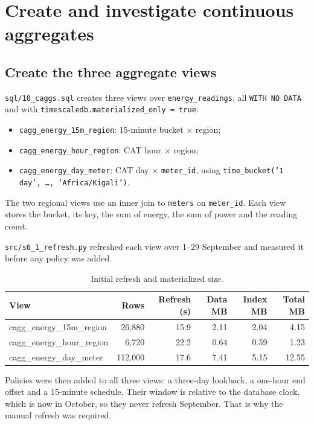 \documentclass[11pt,a4paper]{article}
\begin{document}
\section{Create and investigate continuous aggregates}

\subsection{Create the three aggregate views}
\texttt{sql/10\_caggs.sql} creates three views over \texttt{energy\_readings}, all
\texttt{WITH NO DATA} and with \texttt{timescaledb.materialized\_only = true}:
\begin{itemize}
\item \texttt{cagg\_energy\_15m\_region}: 15-minute bucket $\times$ region;
\item \texttt{cagg\_energy\_hour\_region}: CAT hour $\times$ region;
\item \texttt{cagg\_energy\_day\_meter}: CAT day $\times$ \texttt{meter\_id}, using
\texttt{time\_bucket('1 day', \ldots, 'Africa/Kigali')}.
\end{itemize}
The two regional views use an inner join to \texttt{meters} on \texttt{meter\_id}.
Each view stores the bucket, its key, the sum of energy, the sum of power and the
reading count.

\texttt{src/s6\_1\_refresh.py} refreshed each view over 1--29 September and measured it
before any policy was added.

\begin{table}[H]\centering\small
\begin{tabular}{lrrrrr}\toprule
View & Rows & Refresh (s) & Data MB & Index MB & Total MB\\\midrule
cagg\_energy\_15m\_region & 26,880 & 15.9 & 2.11 & 2.04 & 4.15\\
cagg\_energy\_hour\_region & 6,720 & 22.2 & 0.64 & 0.59 & 1.23\\
cagg\_energy\_day\_meter & 112,000 & 17.6 & 7.41 & 5.15 & 12.55\\\bottomrule
\end{tabular}
\caption{Initial refresh and materialized size.}
\end{table}

Policies were then added to all three views: a three-day lookback, a one-hour end
offset and a 15-minute schedule. Their window is relative to the database clock, which
is now in October, so they never refresh September. That is why the manual refresh was
required.
\end{document}
